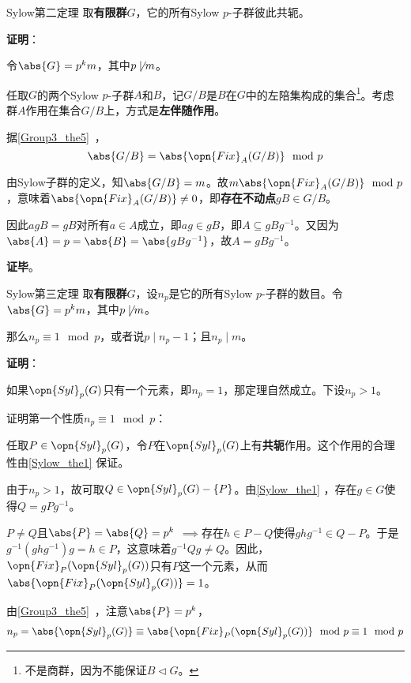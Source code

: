\begin{theorem}{Sylow第二定理}\label{Sylow_the1}
取\textbf{有限群}$G$，它的所有Sylow $p$-子群彼此共轭。
\end{theorem}

\textbf{证明}：

令$\abs{G}=p^km$，其中$p\not\mid m$。

任取$G$的两个Sylow $p$-子群$A$和$B$，记$G/B$是$B$在$G$中的左陪集构成的集合\footnote{不是商群，因为不能保证$B\vartriangleleft G$。}。考虑群$A$作用在集合$G/B$上，方式是\textbf{左伴随作用}。

据\autoref{Group3_the5}~，
\begin{equation}
\abs{G/B} = \abs{\opn{Fix}_A(G/B)} \mod p
\end{equation}

由Sylow子群的定义，知$\abs{G/B}=m$。故$m\abs{\opn{Fix}_A(G/B)} \mod p$，意味着$\abs{\opn{Fix}_A(G/B)}\neq 0$，即\textbf{存在不动点}$gB\in G/B$。

因此$agB=gB$对所有$a\in A$成立，即$ag\in gB$，即$A\subseteq gBg^{-1}$。又因为$\abs{A}=p=\abs{B}=\abs{gBg^{-1}}$，故$A=gBg^{-1}$。


\textbf{证毕}。




\begin{theorem}{Sylow第三定理}\label{Sylow_the2}
取\textbf{有限群}$G$，设$n_p$是它的所有Sylow $p$-子群的数目。令$\abs{G}=p^km$，其中$p\not\mid m$。

那么$n_p\equiv 1\mod p$，或者说$p\mid n_p-1$；且$n_p\mid m$。
\end{theorem}

\textbf{证明}：

如果$\opn{Syl}_p(G)$只有一个元素，即$n_p=1$，那定理自然成立。下设$n_p>1$。


证明第一个性质$n_p\equiv 1\mod p$：

任取$P\in\opn{Syl}_p(G)$，令$P$在$\opn{Syl}_p(G)$上有\textbf{共轭}作用。这个作用的合理性由\autoref{Sylow_the1} 保证。

由于$n_p>1$，故可取$Q\in \opn{Syl}_p(G)-\{P\}$。由\autoref{Sylow_the1} ，存在$g\in G$使得$Q=gPg^{-1}$。

$P\neq Q$且$\abs{P}=\abs{Q}=p^k$ $\implies$存在$h\in P-Q$使得$ghg^{-1}\in Q-P$。于是$g^{-1}(ghg^{-1})g=h\in P$，这意味着$g^{-1}Qg\neq Q$。因此，$\opn{Fix}_P(\opn{Syl}_p(G))$只有$P$这一个元素，从而$\abs{\opn{Fix}_P(\opn{Syl}_p(G))}=1$。

由\autoref{Group3_the5}~，注意$\abs{P}=p^k$，
\begin{equation}\label{Sylow_eq1}
\begin{aligned}
n_p=\abs{\opn{Syl}_p(G)}\equiv\abs{\opn{Fix}_P(\opn{Syl}_p(G))}\mod p\equiv 1\mod p
\end{aligned}
\end{equation}


